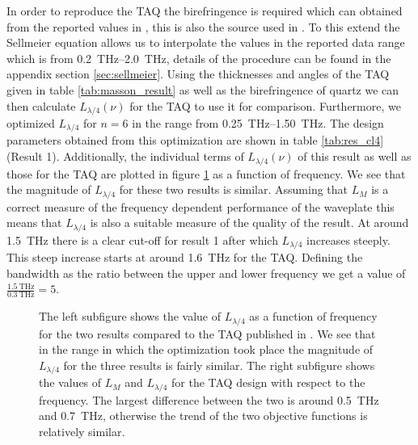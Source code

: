 In order to reproduce the TAQ the birefringence is required which can obtained from the reported values in \cite{DGrischkowsky1990}, this is also the source used in \cite{Masson2006}. To this extend the Sellmeier equation allows us to interpolate the values in the reported data range which is from \SIrange{0.2}{2.0}{\tera \hertz}, details of the procedure can be found in the appendix section \ref{sec:sellmeier}. Using the thicknesses and angles of the TAQ given in table \ref{tab:masson_result} as well as the birefringence of quartz we can then calculate $L_{\lambda/4}(\nu)$ for the TAQ to use it for comparison. Furthermore, we optimized $L_{\lambda/4}$ for $n=6$ in the range from \SIrange{0.25}{1.50}{\tera \hertz}. The design parameters obtained from this optimization are shown in table \ref{tab:res_cl4} (Result 1). Additionally, the individual terms of $L_{\lambda/4}(\nu)$ of this result as well as those for the TAQ are plotted in figure \ref{fig:loss_function_cl4} as a function of frequency. We see that the magnitude of $L_{\lambda/4}$ for these two results is similar. Assuming that $L_{M}$ is a correct measure of the frequency dependent performance of the waveplate this means that $L_{\lambda/4}$ is also a suitable measure of the quality of the result. At around \SI{1.5}{\tera \hertz} there is a clear cut-off for result 1 after which $L_{\lambda/4}$ increases steeply. This steep increase starts at around \SI{1.6}{\tera \hertz} for the TAQ. Defining the bandwidth as the ratio between the upper and lower frequency we get a value of  $\frac{\SI{1.5}{\tera \hertz}}{\SI{0.3}{\tera \hertz}}=5$. 

\begin{table}[ht]
    \centering
    
    \caption{Design parameters for result 1 and 2. Both results are obtained through the optimization of $L_{\lambda/4}$ for $n=6$. In the case of result 1 the frequency range for the optimization was limited to \SIrange[range-phrase=-, range-units=single]{0.25}{1.50}{\tera \hertz} while for result 2 the range was set to \SIrange[range-phrase=-, range-units=single]{0.50}{2.25}{\tera \hertz}.}
    \label{tab:res_cl4}
\end{table}

\begin{figure}[H]
    \centering
    
    \caption{The left subfigure shows the value of $L_{\lambda/4}$ as a function of frequency for the two results compared to the TAQ published in \cite{Masson2006}. We see that in the range in which the optimization took place the magnitude of $L_{\lambda/4}$ for the three results is fairly similar. The right subfigure shows the values of $L_M$ and $L_{\lambda/4}$ for the TAQ design with respect to the frequency. The largest difference between the two is around \SI{0.5}{\tera \hertz} and \SI{0.7}{\tera \hertz}, otherwise the trend of the two objective functions is relatively similar.}
    \label{fig:loss_function_cl4}
\end{figure}

